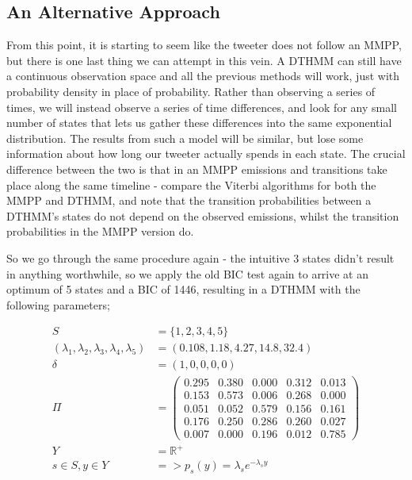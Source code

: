\subsection{An Alternative Approach}

From this point, it is starting to seem like the tweeter does not follow an MMPP, but there is one last thing we can attempt in this vein. A DTHMM can still have a continuous observation space and all the previous methods will work, just with probability density in place of probability. Rather than observing a series of times, we will instead observe a series of time differences, and look for any small number of states that lets us gather these differences into the same exponential distribution. The results from such a model will be similar, but lose some information about how long our tweeter actually spends in each state. The crucial difference between the two is that in an MMPP emissions and transitions take place along the same timeline - compare the Viterbi algorithms for both the MMPP and DTHMM, and note that the transition probabilities between a DTHMM's states do not depend on the observed emissions, whilst the transition probabilities in the MMPP version do.

So we go through the same procedure again - the intuitive 3 states didn't result in anything worthwhile, so we apply the old BIC test again to arrive at an optimum of 5 states and a BIC of 1446, resulting in a DTHMM with the following parameters;

\begin{align*}
S &= \{1,2,3,4,5\}\\
(\lambda_1,\lambda_2,\lambda_3,\lambda_4,\lambda_5) &= (0.108, 1.18, 4.27, 14.8, 32.4)\\
\delta &= (1,0,0,0,0)\\
\Pi &= 
\left(
    \begin{matrix}
    0.295 & 0.380 & 0.000 & 0.312 & 0.013 \\
    0.153 & 0.573 & 0.006 & 0.268 & 0.000 \\
    0.051 & 0.052 & 0.579 & 0.156 & 0.161 \\
    0.176 & 0.250 & 0.286 & 0.260 & 0.027 \\
    0.007 & 0.000 & 0.196 & 0.012 & 0.785
    \end{matrix}
\right)\\
Y &= \mathbb{R}^{+}\\
s \in S, y \in Y &=> p_s(y) = \lambda_s e^{-\lambda_sy}\\
\end{align*}

